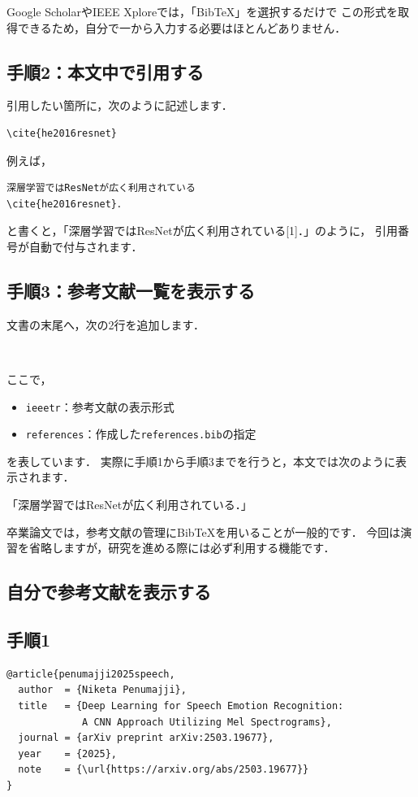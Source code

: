 \documentclass[a4paper,twocolumn]{jsarticle}
\begin{document}
Google ScholarやIEEE Xploreでは，「BibTeX」を選択するだけで
この形式を取得できるため，自分で一から入力する必要はほとんどありません．

\subsection*{手順2：本文中で引用する}
引用したい箇所に，次のように記述します．

\begin{verbatim}
\cite{he2016resnet}
\end{verbatim}

例えば，

\begin{verbatim}
深層学習ではResNetが広く利用されている
\cite{he2016resnet}．
\end{verbatim}

と書くと，「深層学習ではResNetが広く利用されている[1]．」のように，
引用番号が自動で付与されます．

\subsection*{手順3：参考文献一覧を表示する}
文書の末尾へ，次の2行を追加します．

\begin{verbatim}


\end{verbatim}

ここで，

\begin{itemize}
    \item \texttt{ieeetr}：参考文献の表示形式
    \item \texttt{references}：作成した\texttt{references.bib}の指定
\end{itemize}

を表しています．
実際に手順1から手順3までを行うと，本文では次のように表示されます．

「深層学習ではResNetが広く利用されている\cite{he2016resnet}．」

卒業論文では，参考文献の管理にBibTeXを用いることが一般的です．
今回は演習を省略しますが，研究を進める際には必ず利用する機能です．

\subsection{自分で参考文献を表示する}
\subsection{手順1}
\begin{lstlisting}[language={}]
@article{penumajji2025speech,
  author  = {Niketa Penumajji},
  title   = {Deep Learning for Speech Emotion Recognition:
             A CNN Approach Utilizing Mel Spectrograms},
  journal = {arXiv preprint arXiv:2503.19677},
  year    = {2025},
  note    = {\url{https://arxiv.org/abs/2503.19677}}
}
\end{lstlisting}
\end{document}
